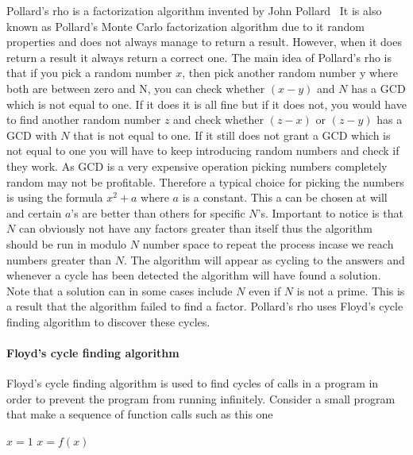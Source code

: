 Pollard’s rho is a factorization algorithm invented by John Pollard~\cite{pollard} It is also known as Pollard’s Monte Carlo factorization algorithm due to it random properties and does not always manage to return a result. However, when it does return a result it always return a correct one.
The main idea of Pollard’s rho is that if you pick a random number \(x\), then pick another random number y where both are between zero and N, you can check whether \((x-y)\) and \(N\) has a GCD which is not equal to one. If it does it is all fine but if it does not, you would have to find another random number \(z\) and check whether \((z-x)\) or \((z-y)\) has a GCD with \(N\) that is not equal to one. If it still does not grant a GCD which is not equal to one you will have to keep introducing random numbers and check if they work.
As GCD is a very expensive operation picking numbers completely random may not be profitable. Therefore a typical choice for picking the numbers is using the formula \(x^2 + a\) where \(a\) is a constant. This a can be chosen at will and certain \(a\)’s are better than others for specific \(N\)’s.
Important to notice is that \(N\) can obviously not have any factors greater than itself thus the algorithm should be run in modulo \(N\) number space to repeat the process incase we reach numbers greater than \(N\). 
The algorithm will appear as cycling to the answers and whenever a cycle has been detected the algorithm will have found a solution. Note that a solution can in some cases include \(N\) even if \(N\) is not a prime. This is a result that the algorithm failed to find a factor. Pollard’s rho uses Floyd’s cycle finding algorithm to discover these cycles.

\paragraph{Floyd’s cycle finding algorithm}

Floyd’s cycle finding algorithm is used to find cycles of calls in a program in order to prevent the program from running infinitely. Consider a small program that make a sequence of function calls such as this one

\begin{algorithm}
	\begin{algorithmic}
		\State $x = 1$
			\State $x = f(x)$
		\EndWhile	
	\end{algorithmic}
\end{algorithm}

